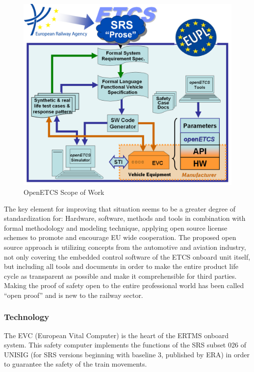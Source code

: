 \documentclass{template/openetcs_article}
\begin{document}
\begin{figure}
\includegraphics[width=\textwidth]{./figures/openETCS_EUPL.png}
\caption{OpenETCS Scope of Work}
\end{figure}

The key element for improving that situation seems to be a greater degree of standardization for: Hardware, software, methods and tools in combination with formal methodology and modeling technique, applying open source license schemes to promote and encourage EU wide cooperation. The proposed open source approach is utilizing concepts from the automotive and aviation industry, not only covering the embedded control software of the ETCS onboard unit itself, but including all tools and documents in order to make the entire product life cycle as transparent as possible and make it comprehensible for third parties. Making the proof of safety open to the entire professional world has been called ``open proof'' and is new to the railway sector.


\subsubsection{Technology}
The EVC (European Vital Computer) is the heart of the ERTMS onboard system. This safety computer implements the functions of the SRS subset 026 of UNISIG (for SRS versions beginning with baseline 3, published by ERA) in order to guarantee the safety of the train movements.
\end{document}
